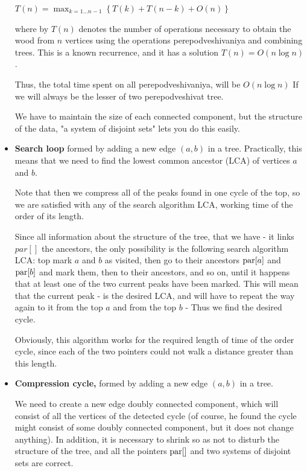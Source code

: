 \begin{itemize}
$T(n)=\max_{k=1\ldots n-1}\left\{ T(k)+T(n-k)+O(n)\right\} $

where by $T (n)$ denotes the number of operations necessary to obtain the wood from $n$ vertices using the operations perepodveshivaniya and combining trees. This is a known recurrence, and it has a solution $T (n) = O (n \log n)$.

Thus, the total time spent on all perepodveshivaniya, will be $O (n \log n)$ If we will always be the lesser of two perepodveshivat tree.

We have to maintain the size of each connected component, but the structure of the data, "a system of disjoint sets" lets you do this easily.

\item \textbf{Search loop} formed by adding a new edge $(a, b)$ in a tree. Practically, this means that we need to find the lowest common ancestor (LCA) of vertices $a$ and $b$.

Note that then we compress all of the peaks found in one cycle of the top, so we are satisfied with any of the search algorithm LCA, working time of the order of its length.

Since all information about the structure of the tree, that we have - it links $par []$ the ancestors, the only possibility is the following search algorithm LCA: top mark $a$ and $b$ as visited, then go to their ancestors ${\rm par} [a]$ and ${\rm par} [b]$ and mark them, then to their ancestors, and so on, until it happens that at least one of the two current peaks have been marked. This will mean that the current peak - is the desired LCA, and will have to repeat the way again to it from the top $a$ and from the top $b$ - Thus we find the desired cycle.

Obviously, this algorithm works for the required length of time of the order cycle, since each of the two pointers could not walk a distance greater than this length.

\item \textbf{Compression cycle,} formed by adding a new edge $(a, b)$ in a tree.

We need to create a new edge doubly connected component, which will consist of all the vertices of the detected cycle (of course, he found the cycle might consist of some doubly connected component, but it does not change anything). In addition, it is necessary to shrink so as not to disturb the structure of the tree, and all the pointers ${\rm par} []$ and two systems of disjoint sets are correct.


\end{itemize}
